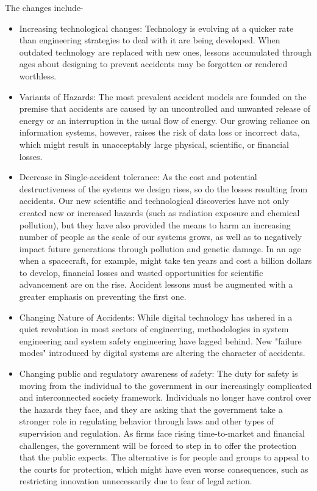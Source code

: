 The changes include-
\begin{itemize}
	\item Increasing technological changes: Technology is evolving at a quicker rate than engineering strategies to deal with it are being developed. When outdated technology are replaced with new ones, lessons accumulated through ages about designing to prevent accidents may be forgotten or rendered worthless.
	\item Variants of Hazards: The most prevalent accident models are founded on the premise that accidents are caused by an uncontrolled and unwanted release of energy or an interruption in the usual flow of energy. Our growing reliance on information systems, however, raises the risk of data loss or incorrect data, which might result in unacceptably large physical, scientific, or financial losses.
	\item Decrease in Single-accident tolerance: As the cost and potential destructiveness of the systems we design rises, so do the losses resulting from accidents. Our new scientific and technological discoveries have not only created new or increased hazards (such as radiation exposure and chemical pollution), but they have also provided the means to harm an increasing number of people as the scale of our systems grows, as well as to negatively impact future generations through pollution and genetic damage. In an age when a spacecraft, for example, might take ten years and cost a billion dollars to develop, financial losses and wasted opportunities for scientific advancement are on the rise. Accident lessons must be augmented with a greater emphasis on preventing the first one.
	\item Changing Nature of Accidents: While digital technology has ushered in a quiet revolution in most sectors of engineering, methodologies in system engineering and system safety engineering have lagged behind. New "failure modes" introduced by digital systems are altering the character of accidents.
	\item Changing public and regulatory awareness of safety: The duty for safety is moving from the individual to the government in our increasingly complicated and interconnected society framework. Individuals no longer have control over the hazards they face, and they are asking that the government take a stronger role in regulating behavior through laws and other types of supervision and regulation. As firms face rising time-to-market and financial challenges, the government will be forced to step in to offer the protection that the public expects. The alternative is for people and groups to appeal to the courts for protection, which might have even worse consequences, such as restricting innovation unnecessarily due to fear of legal action.

\end{itemize}
